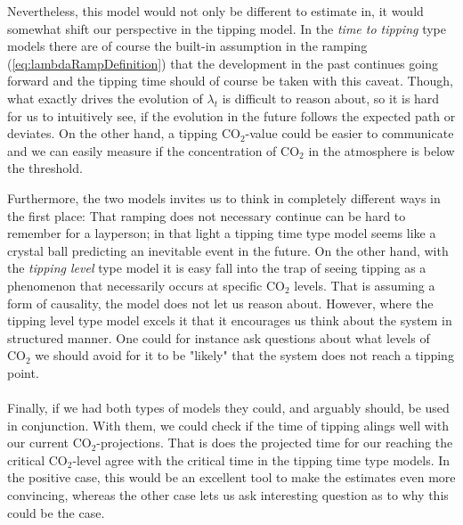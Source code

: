 Nevertheless, this model would not only be different to estimate in, it would somewhat shift our perspective in the tipping model. In the \textit{time to tipping} type models there are of course the built-in assumption in the ramping (\ref{eq:lambdaRampDefinition}) that the development in the past continues going forward and the tipping time should of course be taken with this caveat. Though, what exactly drives the evolution of $\lambda_t$ is difficult to reason about, so it is hard for us to intuitively see, if the evolution in the future follows the expected path or deviates. On the other hand, a tipping $\mathrm{CO}_2$-value could be easier to communicate and we can easily measure if the concentration of $\mathrm{CO}_2$ in the atmosphere is below the threshold. 

Furthermore, the two models invites us to think in completely different ways in the first place: That ramping does not necessary continue can be hard to remember for a layperson; in that light a tipping time type model seems like a crystal ball predicting an inevitable event in the future. On the other hand, with the \textit{tipping level} type model it is easy fall into the trap of seeing tipping as a phenomenon that necessarily occurs at specific $\mathrm{CO}_2$ levels. That is assuming a form of causality, the model does not let us reason about. However, where the tipping level type model excels it that it encourages us think about the system in structured manner. One could for instance ask questions about what levels of $\mathrm{CO}_2$ we should avoid for it to be "likely" that the system does not reach a tipping point. \\\\
Finally, if we had both types of models they could, and arguably should, be used in conjunction. With them, we could check if the time of tipping alings well with our current $\mathrm{CO}_2$-projections. That is does the projected time for our reaching the critical $\mathrm{CO}_2$-level agree with the critical time in the tipping time type models. In the positive case, this would be an excellent tool to make the estimates even more convincing, whereas the other case lets us ask interesting question as to why this could be the case.

